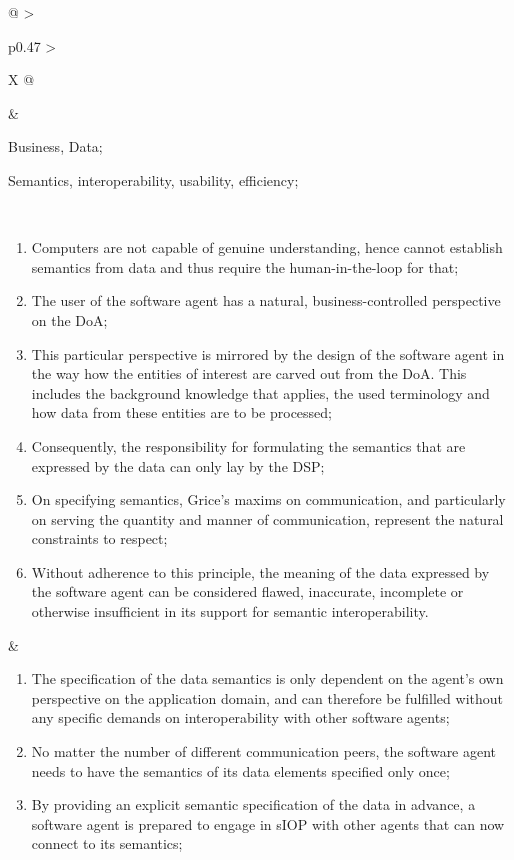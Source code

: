 \begin{xltabular}[l]{\linewidth}{@{} >{\small\raggedright\arraybackslash}p{0.47\linewidth} >{\small\raggedright\arraybackslash}X @{}}
\begin{mmdp}
\end{mmdp}
&
\begin{description}[labelwidth=3.7cm,leftmargin=3.7cm+1ex,nosep,topsep=2ex,labelsep=1ex,font=\bfseries]
  \item[Type of information:] Business, Data;
  \item[Quality attributes:] Semantics, interoperability, usability, efficiency;
\end{description} \\
\begin{enumerate}[left=6pt, nosep]
  \item Computers are not capable of genuine understanding, hence cannot establish semantics from data and thus require the human-in-the-loop for that;
  \item The user of the software agent has a natural, business-controlled perspective on the DoA;
  \item This particular perspective is mirrored by the design of the software agent in the way how the entities of interest are carved out from the DoA. This includes the background knowledge that applies, the used terminology and how data from these entities are to be processed;
  \item Consequently, the responsibility for formulating the semantics that are expressed by the data can only lay by the DSP;
  \item On specifying semantics, Grice’s maxims on communication, and particularly on serving the quantity and manner of communication, represent the natural constraints to respect;
  \item Without adherence to this principle, the meaning of the data expressed by the software agent can be considered flawed, inaccurate, incomplete or otherwise insufficient in its support for semantic interoperability.
\end{enumerate}
&
\begin{enumerate}[left=10pt, nosep]
  \item The specification of the data semantics is only dependent on the agent’s own perspective on the application domain, and can therefore be fulfilled without any specific demands on interoperability with other software agents;
  \item No matter the number of different communication peers, the software agent needs to have the semantics of its data elements specified only once;
  \item By providing an explicit semantic specification of the data in advance, a software agent is prepared to engage in sIOP with other agents that can now connect to its semantics;

\end{enumerate}
\end{xltabular}
